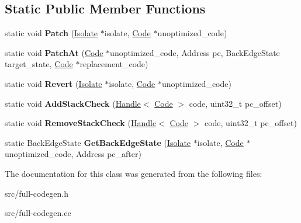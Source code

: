 \subsection*{Static Public Member Functions}
\begin{DoxyCompactItemize}
\item 
\hypertarget{classv8_1_1internal_1_1_back_edge_table_a948f9633cd9b7de2c75db208b687329a}{}static void {\bfseries Patch} (\hyperlink{classv8_1_1internal_1_1_isolate}{Isolate} $\ast$isolate, \hyperlink{classv8_1_1internal_1_1_code}{Code} $\ast$unoptimized\+\_\+code)\label{classv8_1_1internal_1_1_back_edge_table_a948f9633cd9b7de2c75db208b687329a}

\item 
\hypertarget{classv8_1_1internal_1_1_back_edge_table_a6c051f1b5eca4c03f8f3147c71ac051c}{}static void {\bfseries Patch\+At} (\hyperlink{classv8_1_1internal_1_1_code}{Code} $\ast$unoptimized\+\_\+code, Address pc, Back\+Edge\+State target\+\_\+state, \hyperlink{classv8_1_1internal_1_1_code}{Code} $\ast$replacement\+\_\+code)\label{classv8_1_1internal_1_1_back_edge_table_a6c051f1b5eca4c03f8f3147c71ac051c}

\item 
\hypertarget{classv8_1_1internal_1_1_back_edge_table_aa4a8da5df024f0696f8be96ec8f5dbec}{}static void {\bfseries Revert} (\hyperlink{classv8_1_1internal_1_1_isolate}{Isolate} $\ast$isolate, \hyperlink{classv8_1_1internal_1_1_code}{Code} $\ast$unoptimized\+\_\+code)\label{classv8_1_1internal_1_1_back_edge_table_aa4a8da5df024f0696f8be96ec8f5dbec}

\item 
\hypertarget{classv8_1_1internal_1_1_back_edge_table_ae5dbef1c3dd27f0ccf34f8d22563aa8e}{}static void {\bfseries Add\+Stack\+Check} (\hyperlink{classv8_1_1internal_1_1_handle}{Handle}$<$ \hyperlink{classv8_1_1internal_1_1_code}{Code} $>$ code, uint32\+\_\+t pc\+\_\+offset)\label{classv8_1_1internal_1_1_back_edge_table_ae5dbef1c3dd27f0ccf34f8d22563aa8e}

\item 
\hypertarget{classv8_1_1internal_1_1_back_edge_table_a384f587613951eb9271c2320131f3ed8}{}static void {\bfseries Remove\+Stack\+Check} (\hyperlink{classv8_1_1internal_1_1_handle}{Handle}$<$ \hyperlink{classv8_1_1internal_1_1_code}{Code} $>$ code, uint32\+\_\+t pc\+\_\+offset)\label{classv8_1_1internal_1_1_back_edge_table_a384f587613951eb9271c2320131f3ed8}

\item 
\hypertarget{classv8_1_1internal_1_1_back_edge_table_ae4104ee5562bfe57be87eb6ce940ed73}{}static Back\+Edge\+State {\bfseries Get\+Back\+Edge\+State} (\hyperlink{classv8_1_1internal_1_1_isolate}{Isolate} $\ast$isolate, \hyperlink{classv8_1_1internal_1_1_code}{Code} $\ast$unoptimized\+\_\+code, Address pc\+\_\+after)\label{classv8_1_1internal_1_1_back_edge_table_ae4104ee5562bfe57be87eb6ce940ed73}

\end{DoxyCompactItemize}


The documentation for this class was generated from the following files\+:\begin{DoxyCompactItemize}
\item 
src/full-\/codegen.\+h\item 
src/full-\/codegen.\+cc\end{DoxyCompactItemize}
